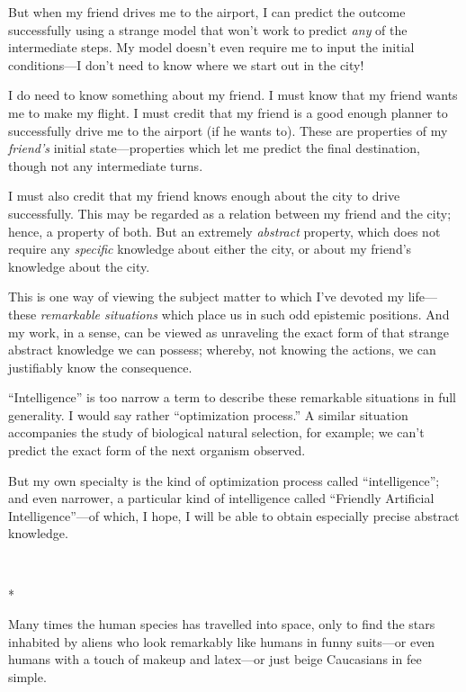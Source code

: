 {
 But when my friend drives me to the airport, I can predict the
outcome successfully using a strange model that won't
work to predict \textit{any} of the intermediate steps. My model
doesn't even require me to input the initial
conditions---I don't need to know where we start out in
the city!}

{
 I do need to know something about my friend. I must know that my
friend wants me to make my flight. I must credit that my friend is a
good enough planner to successfully drive me to the airport (if he
wants to). These are properties of my \textit{friend's}
initial state---properties which let me predict the final destination,
though not any intermediate turns.}

{
 I must also credit that my friend knows enough about the city to
drive successfully. This may be regarded as a relation between my
friend and the city; hence, a property of both. But an extremely
\textit{abstract} property, which does not require any
\textit{specific} knowledge about either the city, or about my
friend's knowledge about the city.}

{
 This is one way of viewing the subject matter to which
I've devoted my life---these \textit{remarkable
situations} which place us in such odd epistemic positions. And my
work, in a sense, can be viewed as unraveling the exact form of that
strange abstract knowledge we can possess; whereby, not knowing the
actions, we can justifiably know the consequence.}

{
 ``Intelligence'' is too narrow
a term to describe these remarkable situations in full generality. I
would say rather ``optimization
process.'' A similar situation accompanies the study
of biological natural selection, for example; we can't
predict the exact form of the next organism observed.}

{
 But my own specialty is the kind of optimization process called
``intelligence''; and even narrower,
a particular kind of intelligence called ``Friendly
Artificial Intelligence''---of which, I hope, I will
be able to obtain especially precise abstract knowledge.}

{\centering
 \ ~
\par}

{\centering
 *
\par}


{
 Many times the human species has travelled into space, only to
find the stars inhabited by aliens who look remarkably like humans in
funny suits---or even humans with a touch of makeup and latex---or just
beige Caucasians in fee simple.}

